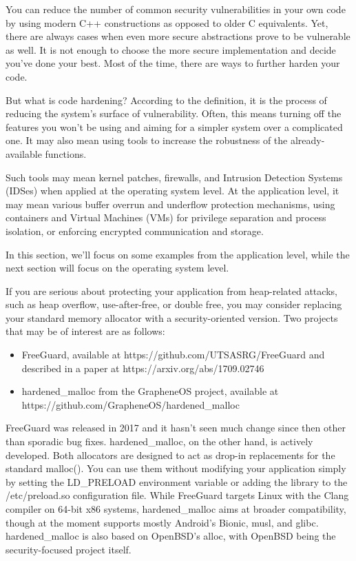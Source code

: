 You can reduce the number of common security vulnerabilities in your own code by using modern C++ constructions as opposed to older C equivalents. Yet, there are always cases when even more secure abstractions prove to be vulnerable as well. It is not enough to choose the more secure implementation and decide you've done your best. Most of the time, there are ways to further harden your code.

But what is code hardening? According to the definition, it is the process of reducing the system's surface of vulnerability. Often, this means turning off the features you won't be using and aiming for a simpler system over a complicated one. It may also mean using tools to increase the robustness of the already-available functions.

Such tools may mean kernel patches, firewalls, and Intrusion Detection Systems (IDSes) when applied at the operating system level. At the application level, it may mean various  buffer overrun and underflow protection mechanisms, using containers and Virtual Machines (VMs) for privilege separation and process isolation, or enforcing encrypted communication and storage.

In this section, we'll focus on some examples from the application level, while the next section will focus on the operating system level.


If you are serious about protecting your application from heap-related attacks, such as heap overflow, use-after-free, or double free, you may consider replacing your standard memory allocator with a security-oriented version. Two projects that may be of interest are as follows:

\begin{itemize}
\item 
FreeGuard, available at https://github.com/UTSASRG/FreeGuard and described in a paper at https://arxiv.org/abs/1709.02746

\item 
hardened\_malloc from the GrapheneOS project, available at https://github.com/GrapheneOS/hardened\_malloc
\end{itemize}

FreeGuard was released in 2017 and it hasn't seen much change since then other than sporadic bug fixes. hardened\_malloc, on the other hand, is actively developed. Both allocators are designed to act as drop-in replacements for the standard malloc(). You can use them without modifying your application simply by setting the LD\_PRELOAD environment variable or adding the library to the /etc/preload.so configuration file. While FreeGuard targets Linux with the Clang compiler on 64-bit x86 systems, hardened\_malloc aims at broader compatibility, though at the moment supports mostly Android's Bionic, musl, and glibc. hardened\_malloc is also based on OpenBSD's alloc, with OpenBSD being the security-focused project itself.

